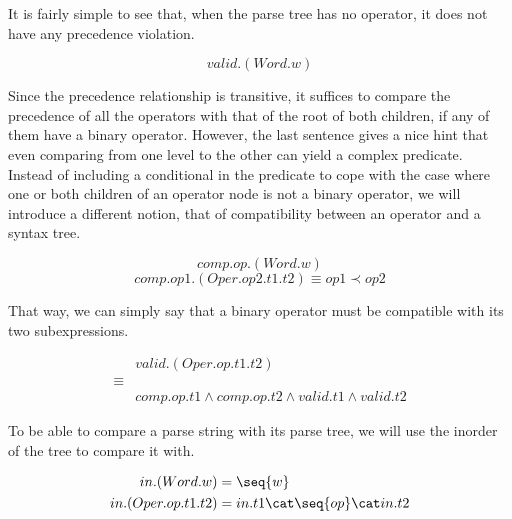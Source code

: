 \documentclass[10pt]{report}
\begin{document}
It is fairly simple to see that, when the parse tree has no operator, it does not have any precedence violation.

\begin{equation}
	valid.(Word.w) 
\end{equation}

Since the precedence relationship is transitive, it suffices to compare the precedence of all the operators with that of the root of both children, if any of them have a binary operator.  However, the last sentence gives a nice hint that even comparing from one level to the other can yield a complex predicate.  Instead of including a conditional in the predicate to cope with the case where one or both children of an operator node is not a binary operator, we will introduce a different notion, that of compatibility between an operator and a syntax tree.

\begin{equation}
	comp.op.(Word.w)
\end{equation}
\begin{equation}
	comp.op1.(Oper.op2.t1.t2) \equiv op1 \prec op2
\end{equation}

That way, we can simply say that a binary operator must be compatible with its two subexpressions.

\begin{align}
		& valid.(Oper.op.t1.t2)  \nonumber \\
	\equiv & \\ 
		& comp.op.t1 \land comp.op.t2 \land valid.t1 \land valid.t2 \nonumber
\end{align}

To be able to compare a parse string with its parse tree, we will use the inorder of the tree to compare it with.

\begin{align}
	in.(Word.w) & = \seq{w} \\
	in.(Oper.op.t1.t2) & = in.t1 \cat \seq{op} \cat in.t2 
\end{align}
\end{document}
